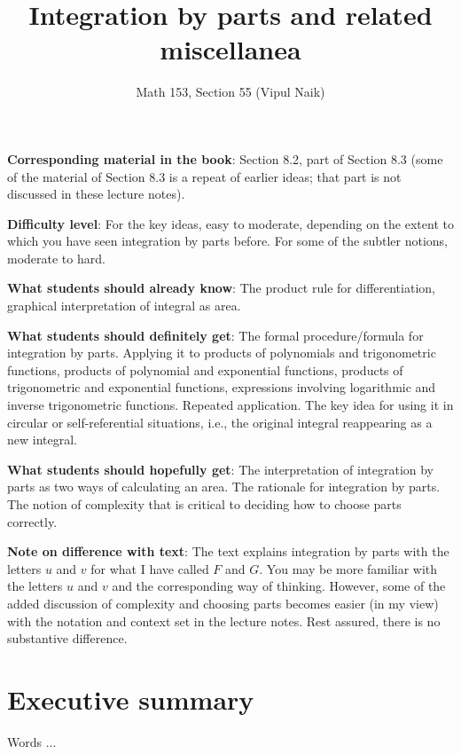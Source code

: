 \documentclass{amsart}
\title{Integration by parts and related miscellanea}
\author{Math 153, Section 55 (Vipul Naik)}
\begin{document}
\maketitle

{\bf Corresponding material in the book}: Section 8.2, part of Section
8.3 (some of the material of Section 8.3 is a repeat of earlier ideas;
that part is not discussed in these lecture notes).

{\bf Difficulty level}: For the key ideas, easy to moderate, depending
on the extent to which you have seen integration by parts before. For
some of the subtler notions, moderate to hard.

{\bf What students should already know}: The product rule for
differentiation, graphical interpretation of integral as area.

{\bf What students should definitely get}: The formal
procedure/formula for integration by parts. Applying it to products of
polynomials and trigonometric functions, products of polynomial and
exponential functions, products of trigonometric and exponential
functions, expressions involving logarithmic and inverse trigonometric
functions. Repeated application. The key idea for using it in circular
or self-referential situations, i.e., the original integral
reappearing as a new integral.

{\bf What students should hopefully get}: The interpretation of
integration by parts as two ways of calculating an area. The rationale
for integration by parts. The notion of complexity that is critical to
deciding how to choose parts correctly.

{\bf Note on difference with text}: The text explains integration by
parts with the letters $u$ and $v$ for what I have called $F$ and
$G$. You may be more familiar with the letters $u$ and $v$ and the
corresponding way of thinking. However, some of the added discussion
of complexity and choosing parts becomes easier (in my view) with the
notation and context set in the lecture notes. Rest assured, there is
no substantive difference.

\section*{Executive summary}

Words ...
\end{document}
